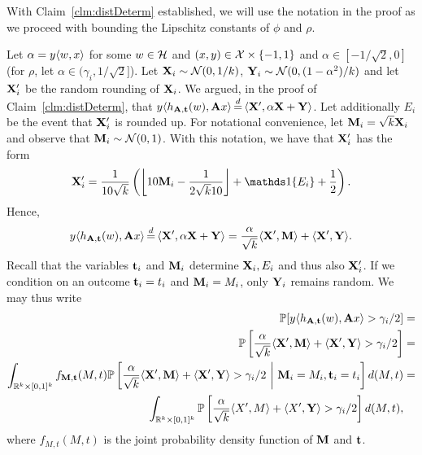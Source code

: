 With Claim~\ref{clm:distDeterm} established, we will use the notation in the proof as we proceed with bounding the Lipschitz constants of $\phi$ and $\rho$.

Let $\alpha = y\langle w,x\rangle$ for some $w \in \mathcal{H}$ and $(x,y) \in \mathcal{X} \times \{-1,1\}$ and $\alpha \in [-1/\sqrt{2}, 0]$ (for $\rho$, let $\alpha \in (\gamma_i, 1/\sqrt{2}]$). Let $\mathbf{X}_i\sim \mathcal{N}(0,1/k)$, $\mathbf{Y}_i\sim\mathcal{N}(0,(1-\alpha^2)/k)$ and let $\mathbf{X}_i'$ be the random rounding of $\mathbf{X}_i$. We argued, in the proof of Claim~\ref{clm:distDeterm}, that
$y\ipr{h_{\rA,\rt}(w),\rA x} \eqd \ipr{\rX',\alpha \rX + \rY}$.
Let additionally $E_i$ be the event that $\mathbf{X}_i'$ is rounded up. For notational convenience, let $\mathbf{M}_i = \sqrt{k} \mathbf{X}_i$ and observe that $\mathbf{M}_i\sim \mathcal{N}(0,1)$. With this notation, we have that $\mathbf{X}_i'$ has the form
\begin{align*}
    \rX_i'
    = \frac{1}{10\sqrt{k}}\left(\left\lfloor{10 \rM_i-\frac{1}{2\sqrt{k}10}}\right\rfloor+\indi{E_i}+\frac{1}{2}\right).
\end{align*}
Hence, 
$$y\ipr{h_{\rA,\rt}(w),\rA x} 
\eqd \ipr{\rX',\alpha \rX + \rY}
= \frac{\alpha}{\sqrt{k}}\ipr{\rX',\rM}+\ipr{\rX',\rY}.$$
Recall that the variables $\mathbf{t}_i$ and $\mathbf{M}_i$ determine $\mathbf{X}_i, E_i$ and thus also $\mathbf{X}'_i$. If we condition on an outcome $\mathbf{t}_i=t_i$ and $\mathbf{M}_i=M_i$, only $\mathbf{Y}_i$ remains random. We may thus write
\begin{align*}
  \mathbb{P}[y\langle h_{\mathbf{A},\mathbf{t}}(w),\mathbf{A} x\rangle > \gamma_i/2 ] &=\\ \mathbb{P}\left[\frac{\alpha}{\sqrt{k}}\langle\mathbf{X}',\mathbf{M}\rangle+\langle\mathbf{X}',\mathbf{Y}\rangle > \gamma_i/2\right]
  &=\\
  \int_{\mathbb{R}^k\times [0,1]^k} f_{\mathbf{M},\mathbf{t}}(M,t)\mathbb{P}\left[\frac{\alpha}{\sqrt{k}}\langle\mathbf{X}',\mathbf{M}\rangle+\langle\mathbf{X}',\mathbf{Y}\rangle >\gamma_i/2 \ \bigg| \  \mathbf{M}_i = M_i, \mathbf{t}_i = t_i\right] d(M,t)
  &=\\ \int_{\mathbb{R}^k\times[0,1]^k} \mathbb{P}\left[\frac{\alpha}{\sqrt{k}}\langle X',M\rangle+\langle X',\mathbf{Y}\rangle > \gamma_i/2\right] d(M,t),
  \end{align*}
where $f_{M,t}(M,t)$ is the joint probability density function of $\mathbf{M}$ and $\mathbf{t}$. 

